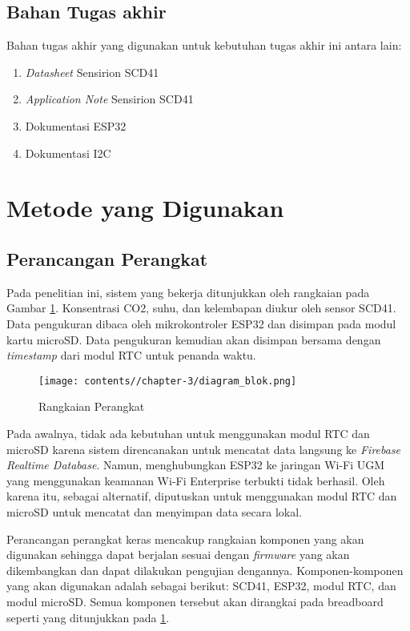     
    \subsection{Bahan Tugas akhir}
    
    Bahan tugas akhir yang digunakan untuk kebutuhan tugas akhir ini antara lain:
    
    \begin{enumerate}
        \item \textit{Datasheet} Sensirion SCD41
        \item \textit{Application Note} Sensirion SCD41
        \item Dokumentasi ESP32
        \item Dokumentasi I2C
    \end{enumerate}

\section{Metode yang Digunakan}

    \subsection{Perancangan Perangkat}
    Pada penelitian ini, sistem yang bekerja ditunjukkan oleh rangkaian pada Gambar \ref{fig:diagram-blok}. Konsentrasi CO2, suhu, dan kelembapan diukur oleh sensor SCD41. Data pengukuran dibaca oleh mikrokontroler ESP32 dan disimpan pada modul kartu microSD. Data pengukuran kemudian akan disimpan bersama dengan \textit{timestamp} dari modul RTC untuk penanda waktu.

    \begin{figure}[H]
        \centering
        \texttt{[image: contents//chapter-3/diagram\_blok.png]}
        \caption{Rangkaian Perangkat}
        \label{fig:diagram-blok}
    \end{figure}

    Pada awalnya, tidak ada kebutuhan untuk menggunakan modul RTC dan microSD karena sistem direncanakan untuk mencatat data langsung ke \textit{Firebase Realtime Database}. Namun, menghubungkan ESP32 ke jaringan Wi-Fi UGM yang menggunakan keamanan Wi-Fi Enterprise terbukti tidak berhasil. Oleh karena itu, sebagai alternatif, diputuskan untuk menggunakan modul RTC dan microSD untuk mencatat dan menyimpan data secara lokal.

    Perancangan perangkat keras mencakup rangkaian komponen yang akan digunakan sehingga dapat berjalan sesuai dengan \textit{firmware} yang akan dikembangkan dan dapat dilakukan pengujian dengannya. Komponen-komponen yang akan digunakan adalah sebagai berikut: SCD41, ESP32, modul RTC, dan modul microSD. Semua komponen tersebut akan dirangkai pada breadboard seperti yang ditunjukkan pada \ref{fig:diagram-blok}.
    
